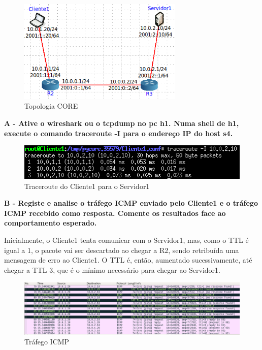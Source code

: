 \documentclass[11pt]{article}
\begin{document}
\begin{figure}[hbt!]
    \centering
    \includegraphics[width=0.7\textwidth]{images/parte1/topologia/core.png}
    \caption{Topologia CORE}
\end{figure}

\vspace{0.5cm}

\textbf{A - Ative o wireshark ou o tcpdump no pc h1. Numa shell de h1, execute o comando traceroute -I para o endereço IP do host s4.}

\begin{figure}[hbt!]
    \centering
    \includegraphics[width=1\textwidth]{images/parte1/topologia/t_route.png}
    \caption{Traceroute do Cliente1 para o Servidor1}
\end{figure}

\clearpage

\textbf{B - Registe e analise o tráfego ICMP enviado pelo Cliente1 e o tráfego ICMP recebido como resposta. Comente os resultados face ao comportamento esperado.}

Inicialmente, o Cliente1 tenta comunicar com o Servidor1, mas, como o TTL é igual a 1, o pacote vai ser descartado ao chegar a R2, sendo retribuída uma mensagem de erro ao Cliente1. O TTL é, então, aumentado sucessivamente, até chegar a TTL 3, que é o mínimo necessário para chegar ao Servidor1.

\begin{figure}[hbt!]
    \centering
    \includegraphics[width=\textwidth]{images/parte1/topologia/trafego_icmp.png}
    \caption{Tráfego ICMP}
\end{figure}
\end{document}
